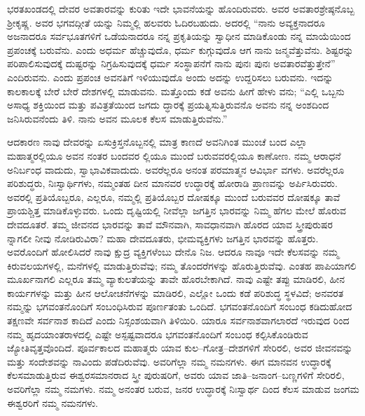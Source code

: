 ಭರತಖಂಡದಲ್ಲಿ ದೇವರ ಅವತಾರವನ್ನು ಕುರಿತು ಇದೇ ಭಾವನೆಯನ್ನು ಹೊಂದಿರುವರು. ಅವರ ಅವತಾರಶ್ರೇಷ್ಠನೊಬ್ಬ ಶ‍್ರೀಕೃಷ್ಣ. ಅವರ ಭಗವದ್ಗೀತೆ ಯನ್ನು ನಿಮ್ಮಲ್ಲಿ ಹಲವರು ಓದಿರಬಹುದು. ಅದರಲ್ಲಿ “ನಾನು ಅವ್ಯಕ್ತನಾದರೂ ಅಜನಾದರೂ ಸರ್ವಭೂತಗಳಿಗೆ ಒಡೆಯನಾದರೂ ನನ್ನ ಪ್ರಕೃತಿಯನ್ನು ಸ್ವಾಧೀನ ಮಾಡಿಕೊಂಡು ನನ್ನ ಮಾಯೆಯಿಂದ ಪ್ರಪಂಚಕ್ಕೆ ಬರುವೆನು. ಎಂದು ಅಧರ್ಮ ಹೆಚ್ಚುವುದೊ, ಧರ್ಮ ಕುಗ್ಗುವುದೊ ಆಗ ನಾನು ಜನ್ಮವೆತ್ತುವೆನು. ಶಿಷ್ಟರನ್ನು ಪರಿಪಾಲಿಸುವುದಕ್ಕೆ ದುಷ್ಟರನ್ನು ನಿಗ್ರಹಿಸುವುದಕ್ಕೆ ಧರ್ಮ ಸಂಸ್ಥಾಪನೆಗೆ ನಾನು ಪುನಃ ಪುನಃ ಅವತಾರವೆತ್ತುತ್ತೇನೆ” ಎಂದಿರುವನು. ಎಂದು ಪ್ರಪಂಚ ಅವನತಿಗೆ ಇಳಿಯುವುದೊ ಅಂದು ಅದನ್ನು ಉದ್ದರಿಸಲು ಬರುವನು. ಇದನ್ನು ಕಾಲಕಾಲಕ್ಕೆ ಬೇರೆ ಬೇರೆ ದೇಶಗಳಲ್ಲಿ ಮಾಡುವನು. ಮತ್ತೊಂದು ಕಡೆ ಅವನು ಹೀಗೆ ಹೇಳು ವನು; “ಎಲ್ಲಿ ಒಬ್ಬನು ಅಸಾಧ್ಯ ಶಕ್ತಿಯಿಂದ ಮತ್ತು ಪವಿತ್ರತೆಯಿಂದ ಜಗದು ದ್ಧಾರಕ್ಕೆ ಪ್ರಯತ್ನಿಸುತ್ತಿರುವನೊ ಅವನು ನನ್ನ ಅಂಶದಿಂದ ಜನಿಸಿರುವನೆಂದು ತಿಳಿ. ನಾನು ಅವನ ಮೂಲಕ ಕೆಲಸ ಮಾಡುತ್ತಿರುವೆನು.”

ಆದಕಾರಣ ನಾವು ದೇವರನ್ನು ಏಸುಕ್ರಿಸ್ತನೊಬ್ಬನಲ್ಲಿ ಮಾತ್ರ ಕಾಣದೆ ಅವನಿಗಿಂತ ಮುಂಚೆ ಬಂದ ಎಲ್ಲಾ ಮಹಾತ್ಮರಲ್ಲಿಯೂ ಅವನ ನಂತರ ಬಂದವರ ಲ್ಲಿಯೂ ಮುಂದೆ ಬರುವವರಲ್ಲಿಯೂ ಕಾಣೋಣ. ನಮ್ಮ ಆರಾಧನೆ ಅನಿರ್ಬಂಧ ವಾದುದು, ಸ್ವಾಭಾವಿಕವಾದುದು. ಅವರೆಲ್ಲರೂ ಅನಂತ ಪರಮಾತ್ಮನ ಆವಿರ್ಭಾ ವಗಳು. ಅವರೆಲ್ಲರೂ ಪರಿಶುದ್ಧರು, ನಿಃಸ್ವಾರ್ಥಿಗಳು, ನಮ್ಮಂತಹ ದೀನ ಮಾನವರ ಉದ್ಧಾರಕ್ಕೆ ಹೋರಾಡಿ ಪ್ರಾಣವನ್ನು ಅರ್ಪಿಸಿರುವರು. ಅವರಲ್ಲಿ ಪ್ರತಿಯೊಬ್ಬರೂ, ಎಲ್ಲರೂ, ನಮ್ಮಲ್ಲಿ ಪ್ರತಿಯೊಬ್ಬರ ದೋಷಕ್ಕೂ ಮುಂದೆ ಬರುವವರ ದೋಷಕ್ಕೂ ತಾವೆ ಪ್ರಾಯಶ್ಚಿತ್ತ ಮಾಡಿಕೊಳ್ಳುವರು. ಒಂದು ದೃಷ್ಟಿಯಲ್ಲಿ ನೀವೆಲ್ಲಾ ಜಗತ್ತಿನ ಭಾರವನ್ನು ನಿಮ್ಮ ಹೆಗಲ ಮೇಲೆ ಹೊರುವ ದೇವದೂತರೆ. ತಮ್ಮ ಜೀವನದ ಭಾರವನ್ನು ತಾವೆ ಮೌನವಾಗಿ, ಸಾವಧಾನವಾಗಿ ಹೊರದ ಯಾವ ಸ್ತ್ರೀಪುರುಷರ ನ್ನಾಗಲೀ ನೀವು ನೋಡಿರುವಿರಾ? ಮಹಾ ದೇವದೂತರು, ಭೀಮವ್ಯಕ್ತಿಗಳು ಜಗತ್ತಿನ ಭಾರವನ್ನು ಹೊತ್ತರು. ಅವರೊಂದಿಗೆ ಹೋಲಿಸಿದರೆ ನಾವು ಕ್ಷುದ್ರ ವ್ಯಕ್ತಿಗಳೆಂಬು ದೇನೊ ನಿಜ. ಆದರೂ ನಾವೂ ಇದೇ ಕೆಲಸವನ್ನು ನಮ್ಮ ಕಿರುವಲಯಗಳಲ್ಲಿ, ಮನೆಗಳಲ್ಲಿ ಮಾಡುತ್ತಿರುವೆವು; ನಮ್ಮ ತೊಂದರೆಗಳನ್ನು ಹೊರುತ್ತಿರುವೆವು. ಎಂತಹ ಪಾಪಿಯಾಗಲಿ ಮೂರ್ಖನಾಗಲಿ ಎಲ್ಲರೂ ತಮ್ಮ ವ್ಯಾಕುಲತೆಯನ್ನು ತಾವೇ ಹೊರಬೇಕಾಗಿದೆ. ನಾವು ಎಷ್ಟೇ ತಪ್ಪು ಮಾಡಿರಲಿ, ಹೀನ ಕಾರ್ಯಗಳನ್ನು ಮತ್ತು ಹೀನ ಆಲೋಚನೆಗಳನ್ನು ಮಾಡಿರಲಿ, ಎಲ್ಲೋ ಒಂದು ಕಡೆ ಪರಿಶುದ್ಧ ಸ್ಥಳವಿದೆ; ಅನವರತ ನಮ್ಮನ್ನು ಭಗವಂತನೊಂದಿಗೆ ಸಂಬಂಧಿಸಿರುವ ಪೂರ್ಣತಂತು ಒಂದಿದೆ. ಭಗವಂತನೊಂದಿಗೆ ಸಂಬಂಧ ಕಡಿದುಹೋದ ತಕ್ಷಣವೇ ಸರ್ವನಾಶ ಕಾದಿದೆ ಎಂದು ನಿಸ್ಸಂಶಯವಾಗಿ ತಿಳಿಯಿರಿ. ಯಾರೂ ಸರ್ವನಾಶವಾಗಲಾರದೆ ಇರುವುದ ರಿಂದ ನಮ್ಮ ಹೃದಯಾಂತರಾಳದಲ್ಲಿ ಎಷ್ಟೇ ಅಸ್ಪಷ್ಟವಾದರೂ ಭಗವಂತನೊಂದಿಗೆ ಸಂಬಂಧ ಕಲ್ಪಿಸಿಕೊಂಡಿರುವ ಜ್ಯೋತಿವೃತ್ತವೊಂದಿದೆ. ಪೂರ್ವಕಾಲದ ಮಹಾತ್ಮರು ಯಾವ ಕುಲ–ಗೋತ್ರ–ದೇಶಗಳಿಗೆ ಸೇರಿರಲಿ, ಅವರ ಜೀವನವನ್ನು ಮತ್ತು ಸಂದೇಶವನ್ನು ನಾವಿಂದು ಪಡೆದಿರುವೆವು. ಅವರಿಗೆಲ್ಲಾ ನಮ್ಮ ನಮನಗಳು. ಈಗ ಮಾನವನ ಉದ್ಧಾರಕ್ಕೆ ಕೆಲಸಮಾಡುತ್ತಿರುವ ಈಶ್ವರಸಮಾನರಾದ ಸ್ತ್ರೀ ಪುರುಷರಿಗೆ, ಅವರು ಯಾವ ಜಾತಿ–ಜನಾಂಗ–ಬಣ್ಣಗಳಿಗೆ ಸೇರಿರಲಿ, ಅವರಿಗೆಲ್ಲಾ ನಮ್ಮ ನಮಗಳು. ನಮ್ಮ ಅನಂತರ ಬರುವ, ಜನರ ಉದ್ಧಾರಕ್ಕೆ ನಿಃಸ್ವಾರ್ಥ ದಿಂದ ಕೆಲಸ ಮಾಡುವ ಜಂಗಮ ಈಶ್ವರರಿಗೆ ನಮ್ಮ ನಮನಗಳು.

